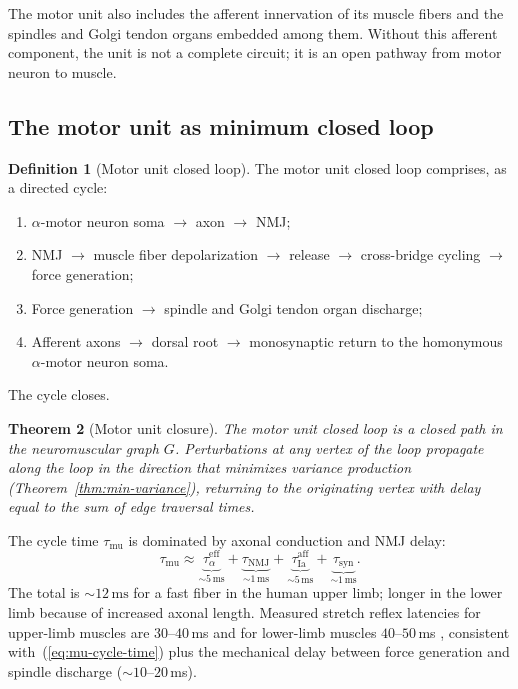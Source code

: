 \documentclass[11pt,twocolumn,a4paper]{article}
\newtheorem{theorem}{Theorem}[section]
\theoremstyle{definition}
\newtheorem{definition}[theorem]{Definition}
\theoremstyle{remark}
\begin{document}
The motor unit also includes the afferent innervation of its muscle
fibers and the spindles and Golgi tendon organs embedded among them.
Without this afferent component, the unit is not a complete circuit;
it is an open pathway from motor neuron to muscle.

\subsection{The motor unit as minimum closed loop}

\begin{definition}[Motor unit closed loop]
The motor unit closed loop comprises, as a directed cycle:
\begin{enumerate}[label=(\roman*),leftmargin=*,itemsep=1pt]
\item $\alpha$-motor neuron soma $\to$ axon $\to$ NMJ;
\item NMJ $\to$ muscle fiber depolarization $\to$
 release $\to$ cross-bridge cycling $\to$ force
generation;
\item Force generation $\to$ spindle and Golgi tendon organ
discharge;
\item Afferent axons $\to$ dorsal root $\to$ monosynaptic return to
the homonymous $\alpha$-motor neuron soma.
\end{enumerate}
The cycle closes.
\end{definition}

\begin{theorem}[Motor unit closure]
\label{thm:motor-unit-closure}
The motor unit closed loop is a closed path in the neuromuscular
graph $G$. Perturbations at any vertex of the loop propagate along the
loop in the direction that minimizes variance production
(Theorem~\ref{thm:min-variance}), returning to the originating vertex
with delay equal to the sum of edge traversal times.
\end{theorem}

The cycle time $\tau_{\mathrm{mu}}$ is dominated by axonal conduction
and NMJ delay:
\begin{equation}
\tau_{\mathrm{mu}} \approx
\underbrace{\tau_{\alpha}^{\mathrm{eff}}}_{\sim 5\,\mathrm{ms}}
+ \underbrace{\tau_{\mathrm{NMJ}}}_{\sim 1\,\mathrm{ms}}
+ \underbrace{\tau_{\mathrm{Ia}}^{\mathrm{aff}}}_{\sim 5\,\mathrm{ms}}
+ \underbrace{\tau_{\mathrm{syn}}}_{\sim 1\,\mathrm{ms}}.
\label{eq:mu-cycle-time}
\end{equation}
The total is $\sim 12\,\mathrm{ms}$ for a fast fiber in the human
upper limb; longer in the lower limb because of increased axonal
length. Measured stretch reflex latencies for upper-limb muscles are
$30$--$40$\,ms and for lower-limb muscles $40$--$50$\,ms
\citep{matthews1990}, consistent with~(\ref{eq:mu-cycle-time}) plus
the mechanical delay between force generation and spindle discharge
($\sim 10$--$20$\,ms).
\end{document}
